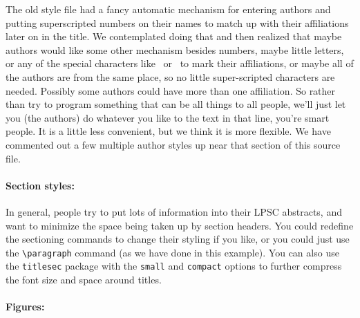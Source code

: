 \documentclass[twoside]{article}
\begin{document}
The old style file had a fancy automatic mechanism for entering
authors and putting superscripted numbers on their names to match
up with their affiliations later on in the title.  We contemplated
doing that and then realized that maybe authors would like some
other mechanism besides numbers, maybe little letters, or any of
the special characters like \dag\ or \ddag\ to mark their affiliations,
or maybe all of the authors are from the same place, so no little
super-scripted characters are needed.  Possibly some authors could
have more than one affiliation.  So rather than try to program
something that can be all things to all people, we'll just let you
(the authors) do whatever you like to the text in that line, you're
smart people.  It is a little less convenient, but we think it is more
flexible.  We have commented out a few multiple author styles up
near that section of this source file.

\paragraph{Section styles:}

In general, people try to put lots of information into their LPSC
abstracts, and want to minimize the space being taken up by section
headers.  You could redefine the sectioning commands to change their
styling if you like, or you could just use the \verb=\paragraph=
command (as we have done in this example).  You can also use the
\texttt{titlesec} package with the \texttt{small} and \texttt{compact}
options to further compress the font size and space around titles.


\paragraph{Figures:}
\end{document}
